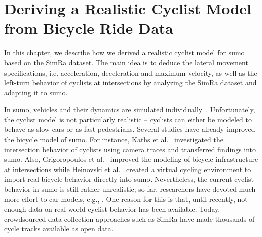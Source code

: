 \chapter{Deriving a Realistic Cyclist Model from Bicycle Ride Data}
\label{cha:sumo}
In this chapter, we describe how we derived a realistic cyclist model for \ac{sumo} based on the SimRa dataset.
The main idea is to deduce the lateral movement specifications, i.e. acceleration, deceleration and maximum velocity, as well as the left-turn behavior of cyclists at intersections by analyzing the SimRa dataset and adapting it to \ac{sumo}.

In \ac{sumo}, vehicles and their dynamics are simulated individually~\cite{lopez2018microscopic}.
Unfortunately, the cyclist model is not particularly realistic -- cyclists can either be modeled to behave as slow cars or as fast pedestrians.
Several studies have already improved the bicycle model of \ac{sumo}.
For instance, Kaths et al.~\cite{kaths2016integration} investigated the intersection behavior of cyclists using camera traces and transferred findings into \ac{sumo}.
Also, Grigoropoulos et al.~\cite{grigoropoulos2019modelling} improved the modeling of bicycle infrastructure at intersections while Heinovski et al.~\cite{heinovski2019modeling} created a virtual cycling environment to import real bicycle behavior directly into \ac{sumo}.
Nevertheless, the current cyclist behavior in \ac{sumo} is still rather unrealistic; so far, researchers have devoted much more effort to car models, e.g., \cite{chandler1958traffic,gazis1961nonlinear,gipps1981behavioural, leutzbach1986development,bando1995dynamical,krauss1998microscopic,treiber2000congested,salles2020extending}.
One reason for this is that, until recently, not enough data on real-world cyclist behavior has been available.
Today, crowdsourced data collection approaches such as SimRa have made thousands of cycle tracks available as open data.

